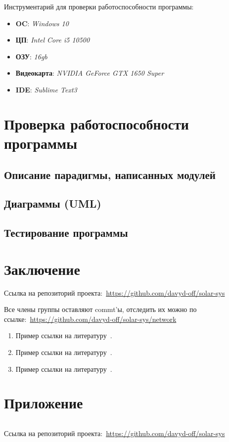 \documentclass[14pt, oneside]{altsu-report}
\begin{document}
Инструментарий для проверки работоспособности программы:
    \begin{itemize}
        \item \textbf{OC}: \textit{Windows 10}
        \item \textbf{ЦП}: \textit{Intel Core i5 10500}
        \item \textbf{ОЗУ}: \textit{16gb}
        \item \textbf{Видеокарта}: \textit{NVIDIA GeForce GTX 1650 Super}
        \item \textbf{IDE}: \textit{Sublime Text3}
    \end{itemize}


\chapter{Проверка работоспособности программы}\label{ch2}
\section{Описание парадигмы, написанных модулей}
\section{Диаграммы (UML)}
\section{Тестирование программы}

\chapter*{Заключение}
Ссылка на репозиторий проекта:~\textcolor{blue}{\url{https://github.com/davyd-off/solar-sys}}

Все члены группы оставляют commt'ы, отследить их можно по ссылке:~\textcolor{blue}{\url{https://github.com/davyd-off/solar-sys/network}}


\begin{enumerate}
\item Пример ссылки на литературу~\cite{wikiRUBitbucket}.
\item Пример ссылки на литературу~\cite{wikiRUIdSoftware}.
\item Пример ссылки на литературу~\cite{wikiRUGitHub}.
\end{enumerate}

\newpage
{}
\printbibliography[title={Список использованной литературы}]

\newpage
\chapter*{Приложение}

\begin{code}
\label{code:solar-sys}
\inputminted[mathescape,linenos,frame=lines,breaklines]{Python}{src/main.py}
\end{code}
Ссылка на репозиторий проекта:~\textcolor{blue}{\url{https://github.com/davyd-off/solar-sys}}
\end{document}
